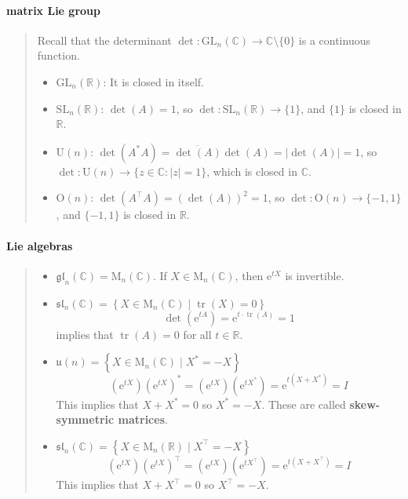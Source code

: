 \documentclass[letterpaper, 10pt]{article}
\theoremstyle{theostyle}
\begin{document}
\paragraph{matrix Lie group}
\begin{quote}
    Recall that the determinant \(\det : \mathrm{GL}_n (\mathbb{C}) \rightarrow \mathbb{C} \setminus \{0\}\) is a continuous function.
    \begin{itemize}
        \item \(\mathrm{GL}_n(\mathbb{R})\): It is closed in itself.
        \item \(\mathrm{SL}_n (\mathbb{R})\):
        \(\det{(A)} = 1\), so \(\det : \mathrm{SL}_n (\mathbb{R}) \rightarrow \{1\}\), and \(\{1\}\) is closed in \(\mathbb{R}\).
        \item \(\mathrm{U}(n)\): 
        \(\det{\left(A^\ast A\right)} = \overline{\det{(A)}} \det{(A)} = \lvert \det{(A)} \rvert = 1\), so \(\det : \mathrm{U}(n) \rightarrow \{z \in \mathbb{C} : \lvert z \rvert = 1\}\), which is closed in \(\mathbb{C}\).
        \item \(\mathrm{O}(n)\):
        \(\det{\left(A^\top A\right)} = \left(\det{(A)}\right)^2 = 1\), so \(\det : \mathrm{O}(n) \rightarrow \{-1, 1\}\), and \(\{-1,1\}\) is closed in \(\mathbb{R}\).
    \end{itemize}
    
\end{quote}

\paragraph{Lie algebras}
\begin{quote}
\begin{itemize}
    \item \(\mathfrak{gl}_n (\mathbb{C}) = \mathrm{M}_n (\mathbb{C}) \).
    If \(X \in \mathrm{M}_n ( \mathbb{C})\), then \(\mathrm{e}^{tX}\) is invertible.
    \item \(\mathfrak{sl}_n (\mathbb{C}) = \left\{X \in \mathrm{M}_n (\mathbb{C}) \mid \operatorname{tr}{(X)} = 0 \right\}\)
    \[\det{\left(\mathrm{e}^{tA}\right)} = \mathrm{e}^{t \cdot \operatorname{tr}{(A)}} = 1\]
    implies that \(\operatorname{tr}{(A)} = 0\) for all \(t \in \mathbb{R}\).
    \item \(\mathfrak{u}(n) = \left\{X \in \mathrm{M}_n (\mathbb{C}) \mid X^* = -X \right\}\)
    \[\left(\mathrm{e}^{tX}\right) \left(\mathrm{e}^{tX}\right)^\ast = \left(\mathrm{e}^{tX}\right) \left(\mathrm{e}^{tX^\ast}\right) = \mathrm{e}^{t\left(X + X^\ast\right)} = I \]
    This implies that \(X + X^\ast = 0\) so \(X^\ast = -X\).
    These are called \textbf{skew-symmetric matrices}.
    \item \(\mathfrak{sl}_n (\mathbb{C}) = \left\{X \in \mathrm{M}_n (\mathbb{R}) \mid X^\top = -X \right\}\)
    \[\left(\mathrm{e}^{tX}\right) \left(\mathrm{e}^{tX}\right)^\top = \left(\mathrm{e}^{tX}\right) \left(\mathrm{e}^{tX^\top}\right) = \mathrm{e}^{t\left(X + X^\top\right)} = I \]
    This implies that \(X + X^\top = 0\) so \(X^\top = -X\).
\end{itemize}
\end{quote}
\end{document}
